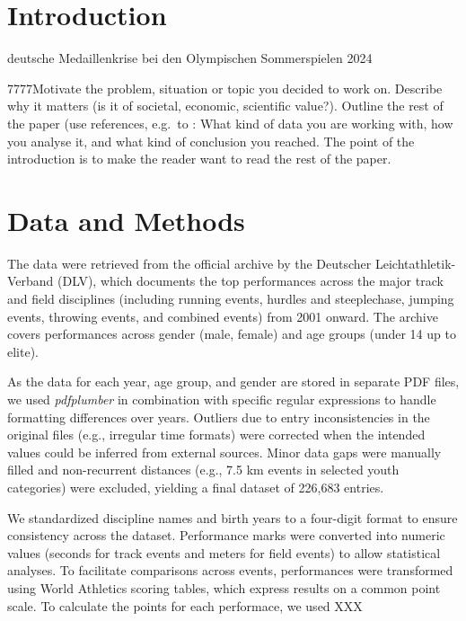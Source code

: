 \begin{abstract}
7777Put your abstract here. Abstracts typically start with a sentence motivating why the subject is interesting. Then mention the data, methodology or methods you are working with, and describe results. 
\end{abstract}

\section{Introduction}\label{sec:intro}

deutsche Medaillenkrise bei den Olympischen Sommerspielen 2024 

7777Motivate the problem, situation or topic you decided to work on. Describe why it matters (is it of societal, economic, scientific value?). Outline the rest of the paper (use references, e.g.~to : What kind of data you are working with, how you analyse it, and what kind of conclusion you reached. The point of the introduction is to make the reader want to read the rest of the paper.

\section{Data and Methods}\label{sec:methods}

The data were retrieved from the official archive by the Deutscher Leichtathletik-Verband (DLV), which documents the top performances across the major track and field disciplines (including running events, hurdles and steeplechase, jumping events, throwing events, and combined events) from 2001 onward. The archive covers performances across gender (male, female) and age groups (under 14 up to elite). 

As the data for each year, age group, and gender are stored in separate PDF files, we used \textit{pdfplumber} in combination with specific regular expressions to handle formatting differences over years. Outliers due to entry inconsistencies in the original files (e.g., irregular time formats) were corrected when the intended values could be inferred from external sources. Minor data gaps were manually filled and non-recurrent distances (e.g., 7.5 km events in selected youth categories) were excluded, yielding a final dataset of 226,683 entries.

We standardized discipline names and birth years to a four-digit format to ensure consistency across the dataset. Performance marks were converted into numeric values (seconds for track events and meters for field events) to allow statistical analyses. To facilitate comparisons across events, performances were transformed using World Athletics scoring tables, which express results on a common point scale. To calculate the points for each performace, we used XXX

